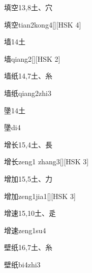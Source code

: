 \begin{entry}{填空}{13,8}{⼟、⽳}
  \begin{phonetics}{填空}{tian2kong4}[][HSK 4]
  \end{phonetics}
\end{entry}

\begin{entry}{墙}{14}{⼟}
  \begin{phonetics}{墙}{qiang2}[][HSK 2]
  \end{phonetics}
\end{entry}

\begin{entry}{墙纸}{14,7}{⼟、⽷}
  \begin{phonetics}{墙纸}{qiang2zhi3}
  \end{phonetics}
\end{entry}

\begin{entry}{墬}{14}{⼟}
  \begin{phonetics}{墬}{di4}
  \end{phonetics}
\end{entry}

\begin{entry}{增长}{15,4}{⼟、⾧}
  \begin{phonetics}{增长}{zeng1 zhang3}[][HSK 3]
  \end{phonetics}
\end{entry}

\begin{entry}{增加}{15,5}{⼟、⼒}
  \begin{phonetics}{增加}{zeng1jia1}[][HSK 3]
  \end{phonetics}
\end{entry}

\begin{entry}{增速}{15,10}{⼟、⾡}
  \begin{phonetics}{增速}{zeng1su4}
  \end{phonetics}
\end{entry}

\begin{entry}{壁纸}{16,7}{⼟、⽷}
  \begin{phonetics}{壁纸}{bi4zhi3}
  \end{phonetics}
\end{entry}

